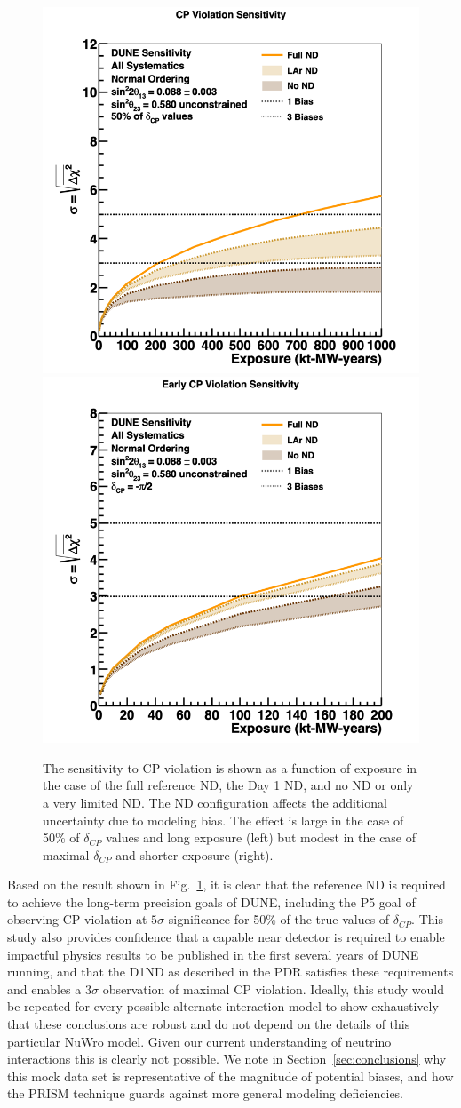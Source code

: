 \documentclass[11pt]{article}
\begin{document}
\begin{figure}[h]
\centering
\includegraphics[width=0.45\columnwidth]{graphics/cpv_exp_nuwrobias_nd_50pc_2019_v4.png}
\includegraphics[width=0.45\columnwidth]{graphics/cpv_exp_nuwrobias_ndearly_max_2019_v4.png}
\caption{The sensitivity to CP violation is shown as a function of exposure in the case of the full reference ND, the Day 1 ND, and no ND or only a very limited ND. The ND configuration affects the additional uncertainty due to modeling bias. The effect is large in the case of 50\% of $\delta_{CP}$ values and long exposure (left) but modest in the case of maximal $\delta_{CP}$ and shorter exposure (right).}
\label{fig:nuwro_sens}
\end{figure}

Based on the result shown in Fig.~\ref{fig:nuwro_sens}, it is clear that the reference ND is required to achieve the long-term precision goals of DUNE, including the P5 goal of observing CP violation at $5 \sigma$ significance for 50\% of the true values of $\delta_{CP}$. This study also provides confidence that a capable near detector is required to enable impactful physics results to be published in the first several years of DUNE running, and that the D1ND as described in the PDR satisfies these requirements and enables a $3 \sigma$ observation of maximal CP violation. Ideally, this study would be repeated for every possible alternate interaction model to show exhaustively that these conclusions are robust and do not depend on the details of this particular NuWro model. Given our current understanding of neutrino interactions this is clearly not possible. We note in Section~\ref{sec:conclusions} why this mock data set is representative of the magnitude of potential biases, and how the PRISM technique guards against more general modeling deficiencies.
\end{document}
